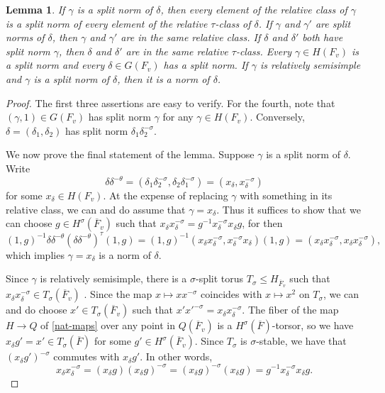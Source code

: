 \documentclass[12pt]{amsart}
\newtheorem{lem}[thm]{Lemma}
\theoremstyle{remark}
\numberwithin{equation}{section}
\theoremstyle{definition}
\renewcommand{\bar}{\overline}
\numberwithin{equation}{subsection}
\begin{document}
\begin{lem} \label{lem-sn}
If $\gamma$ is a split norm of $\delta$, then every
element of the relative class of $\gamma$ is a split norm of every element of the relative $\tau$-class of $\delta$.
If $\gamma$ and $\gamma'$ are split norms of $\delta$, then $\gamma$ and $\gamma'$ are in the same relative class.
If $\delta$ and $\delta'$ both have split norm $\gamma$, then $\delta$ and $\delta'$ are in the same relative $\tau$-class.
Every  $\gamma \in H(F_v)$ is a split norm and every $\delta \in G(F_v)$ has a split
norm.  If $\gamma$ is relatively semisimple and $\gamma$ is a split norm of $\delta$, then it is a norm of $\delta$.
\end{lem}
\begin{proof} The first three assertions are easy to verify.  For the fourth, note that $(\gamma,1) \in G(F_v)$ has
split norm $\gamma$ for any $\gamma \in H(F_v)$.  Conversely, $\delta=(\delta_1,\delta_2)$ has split norm $\delta_1\delta_2^{-\sigma}$.

We now prove the final statement of the lemma.  Suppose $\gamma$ is a split norm of $\delta$.  Write
$$
\delta\delta^{-\theta}=(\delta_1\delta_2^{-\sigma},\delta_2\delta_1^{-\sigma})=
(x_{\delta},x_{\delta}^{-\sigma})
$$
 for some $x_{\delta} \in H(F_v)$.  At the expense of replacing $\gamma$ with something in its relative class, we can and do assume that $\gamma=x_{\delta}$.  Thus it suffices to show that we can choose $g \in H^{\sigma}(\bar{F}_v)$ such that $x_{\delta}x_{\delta}^{-\sigma}=g^{-1}x_{\delta}^{-\sigma}x_{\delta}g$, for then
$$
(1,g)^{-1}\delta \delta^{-\theta}(\delta \delta^{-\theta})^{\tau}(1,g)=(1,g)^{-1}(x_{\delta}x_{\delta}^{-\sigma},x_{\delta}^{-\sigma}x_{\delta})(1,g)=(x_{\delta}x_{\delta}^{-\sigma},x_{\delta}x_{\delta}^{-\sigma}),
$$
which implies $\gamma=x_{\delta}$ is a norm of $\delta$.

Since $\gamma$ is relatively semisimple, there is a $\sigma$-split torus $T_{\sigma} \leq H_{\bar{F}_v}$ such that
$x_{\delta}x_{\delta}^{-\sigma} \in T_{\sigma}(\bar{F}_v)$  \cite[Theorem 7.5]{Rich}.  Since the
map $x \mapsto xx^{-\sigma}$ coincides with $x \mapsto x^2$ on $T_{\sigma}$, we can and do choose $x' \in
T_{\sigma}(\bar{F}_v)$ such that $x'x'^{-\sigma}=x_{\delta}x_{\delta}^{-\sigma}$.
The fiber of the map $H \to Q$ of \eqref{nat-maps} over any point in $Q(\bar{F}_v)$
 is a $H^{\sigma}(\bar{F})$-torsor, so we have
$x_{\delta}g'=x' \in T_{\sigma}(\bar{F})$ for some $g' \in H^{\sigma}(\bar{F}_v)$.
  Since $T_{\sigma}$ is $\sigma$-stable, we have that
$(x_{\delta}g')^{-\sigma}$ commutes with $x_{\delta}g'$.  In other words,
$$
x_{\delta}x_{\delta}^{-\sigma}=(x_{\delta}g)(x_{\delta}g)^{-\sigma}=(x_{\delta}g)^{-\sigma}(x_{\delta}g)=
g^{-1}x_{\delta}^{-\sigma}x_{\delta}g.
$$
\end{proof}
\end{document}
